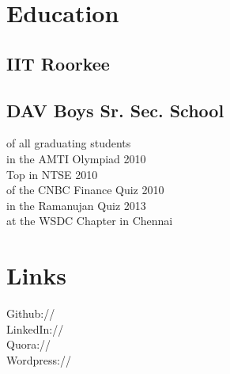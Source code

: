 \documentclass[]{deedy-resume-openfont}
\begin{document}
%
%



%
%

\begin{minipage}[t]{0.33\textwidth} 


\section{Education} 

\subsection{IIT Roorkee}
\sectionsep

\subsection{DAV Boys Sr. Sec. School}
\textbullet{}  of all graduating students \\
\textbullet{}  in the AMTI Olympiad 2010\\
\textbullet{} Top  in NTSE 2010\\
\textbullet{}  of the CNBC Finance Quiz 2010 \\
\textbullet{}  in the Ramanujan Quiz 2013 \\
\textbullet{}  at the WSDC Chapter in Chennai
\sectionsep


\section{Links} 
Github:// \href{https://github.com/rounakbanik}{} \\
LinkedIn://  \href{https://in.linkedin.com/in/rounakbanik
}{} \\
Quora://  \href{https://www.quora.com/Rounak-Banik}{} \\
Wordpress://  \href{https://theblackswansongs.wordpress.com/}{}
\sectionsep


\end{minipage}
\end{document}
